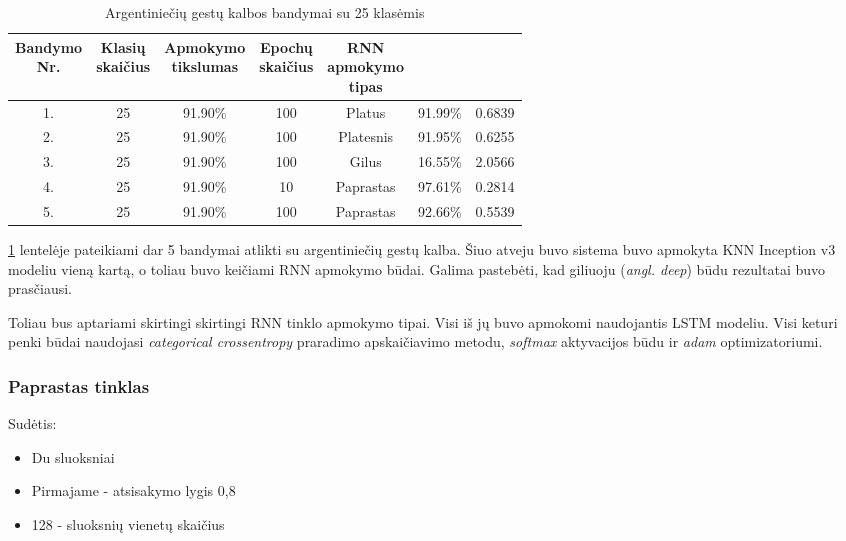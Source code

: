 \documentclass{VUMIFPSbakalaurinis}
\begin{document}
\begin{table}[H]\footnotesize
	\centering
	\caption{Argentiniečių gestų kalbos bandymai su 25 klasėmis}
	{\begin{tabular}{| c | c | c | c | c | c | c |} \hline
		\thead{Bandymo\\Nr.} & \thead{Klasių\\skaičius} & \thead{Apmokymo\\tikslumas} & \thead{Epochų\\skaičius} & \thead{RNN\\apmokymo\\tipas} & \thead{Tikslumas} & \thead{Praradimas}  \\
		\hline
		1. & 25 & 91.90\% & 100 & Platus & 91.99\% & 0.6839 \\
		\hline
		2. & 25 & 91.90\% & 100 & Platesnis & 91.95\% & 0.6255 \\
		\hline
		3. & 25 & 91.90\% & 100 & Gilus & 16.55\% & 2.0566 \\
		\hline
		4. & 25 & 91.90\% & 10 & Paprastas & 97.61\% & 0.2814 \\
		\hline
		5. & 25 & 91.90\% & 100 & Paprastas & 92.66\% & 0.5539 \\
		\hline
	\end{tabular}}
	\label{tab:asl-bandymai2}
\end{table}

\ref{tab:asl-bandymai2} lentelėje pateikiami dar 5 bandymai atlikti su argentiniečių gestų kalba. Šiuo atveju buvo sistema buvo apmokyta KNN Inception v3 modeliu vieną kartą, o toliau buvo keičiami RNN apmokymo būdai. Galima pastebėti, kad giliuoju (\textit{angl. deep}) būdu rezultatai buvo prasčiausi. 

Toliau bus aptariami skirtingi skirtingi RNN tinklo apmokymo tipai. Visi iš jų buvo apmokomi naudojantis LSTM modeliu. Visi keturi penki būdai naudojasi \textit{categorical crossentropy} praradimo apskaičiavimo metodu, \textit{softmax} aktyvacijos būdu ir \textit{adam} optimizatoriumi.

\subsubsection{Paprastas tinklas}
Sudėtis:
\begin{itemize}
	\item Du sluoksniai
	\item Pirmajame - atsisakymo lygis 0,8
	\item 128 - sluoksnių vienetų skaičius
\end{itemize}
\end{document}
